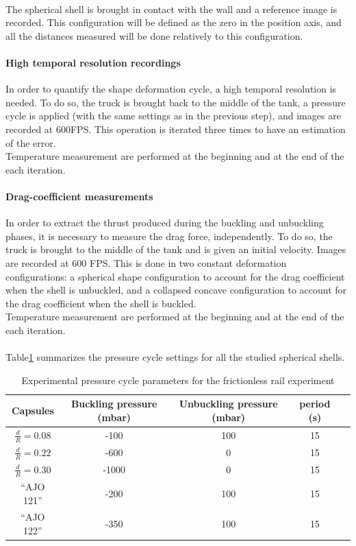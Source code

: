\paragraph{}
The spherical shell is brought in contact with the wall and a reference image is recorded. This configuration will be defined as the zero in the position axis, and all the distances measured will be done relatively to this configuration.
\paragraph{High temporal resolution recordings}
In order to quantify the shape deformation cycle, a high temporal resolution is needed. To do so, the truck is brought back to the middle of the tank, a pressure cycle is applied (with the same settings as in the previous step), and images are recorded at 600FPS. This operation is iterated three times to have an estimation of the error. \\
Temperature measurement are performed at the beginning and at the end of the each iteration.
\paragraph{Drag-coefficient measurements}
In order to extract the thrust produced during the buckling and unbuckling phases, it is necessary to measure the drag force, independently. To do so, the truck is brought to the middle of the tank and is given an initial velocity. Images are recorded at 600 FPS. This is done in two constant deformation configurations: a spherical shape configuration to account for the drag coefficient when the shell is unbuckled, and a collapsed concave configuration to account for the drag coefficient when the shell is buckled.\\
Temperature measurement are performed at the beginning and at the end of the each iteration.
\paragraph{}
Table\ref{tab:pressure_cycle_configuration} summarizes the pressure cycle settings for all the studied spherical shells.
\begin{table}[H]
	\centering
		\begin{adjustbox}{width=\textwidth}
			\begin{tabular}{|c|c|c|c|c|}
				\hline
				Capsules & Buckling pressure (mbar) & Unbuckling pressure (mbar)&period (s)\\
				\hline
				$\frac{d}{R} = 0.08 $ & -100& 100 & 15\\
				$\frac{d}{R} = 0.22 $ & -600& 0 & 15\\
				$\frac{d}{R} = 0.30 $ & -1000 &  0 & 15\\
				\hline
				"`AJO 121"'& -200 & 100 & 15\\
				"`AJO 122"'& -350 & 100 & 15\\
				\hline
			\end{tabular}
		\end{adjustbox}
	\caption{Experimental pressure cycle parameters for the frictionless rail experiment}
	\label{tab:pressure_cycle_configuration}
\end{table}

